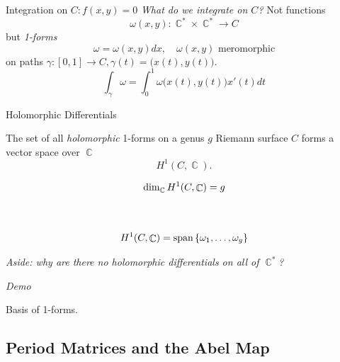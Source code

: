 \documentclass{beamer}
\DeclareMathOperator{\CC}{\mathbb{C}}
\begin{document}
\begin{frame}{Integration on $C : f(x,y) = 0$}{}
  {\it What do we integrate on $C$?} Not functions
  \[
      \omega(x,y) : \CC^* \times \CC^* \to C
  \]
  but {\it 1-forms}
  \[
      \omega = \omega(x,y)dx, \quad \omega(x,y) \text{ meromorphic}
  \]
  on paths $\gamma : [0,1] \to C, \gamma(t) = \big(x(t),y(t)\big)$.
  \[
      \int_\gamma \omega =
      \int_0^1 \omega \big( x(t), y(t) \big) x'(t) dt
  \]
\end{frame}



\begin{frame}{Holomorphic Differentials}{}
  \begin{block}{}
    The set of all {\it holomorphic} 1-forms on a genus $g$ Riemann
    surface $C$ forms a vector space over $\CC$
    \[
        H^1(C,\CC).
    \]
  \end{block}

  \begin{gather*}
      \dim_{\CC} H^1(C,\CC) = g \\
      \vspace{20pt} \\
      H^1(C,\CC) = \text{span} \left\{ \omega_1, \ldots, \omega_g \right\}
  \end{gather*}

  \begin{block}{}
    {\it Aside: why are there no holomorphic differentials on all of
      $\CC^*$?}
  \end{block}
\end{frame}



\begin{frame}{\phantom{Demo}}{}
  \begin{center}
    {\huge \it Demo}

    \vspace{1cm}

    Basis of 1-forms.
  \end{center}
\end{frame}



\subsection{Period Matrices and the Abel Map}
\end{document}
